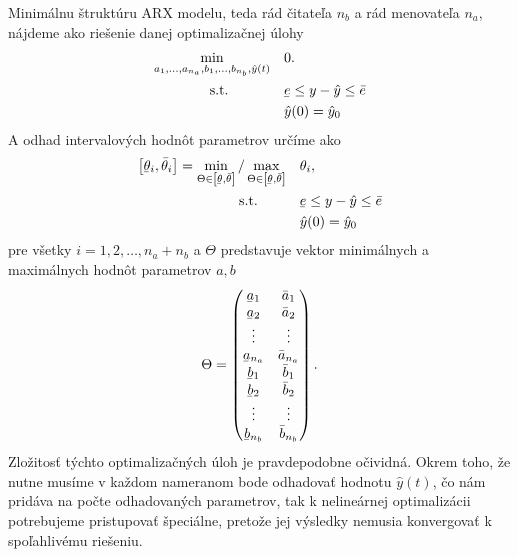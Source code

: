 Minimálnu štruktúru ARX modelu, teda rád čitateľa $ n_b $ a rád menovateľa $ n_a $, nájdeme ako riešenie danej optimalizačnej úlohy
\begin{equation}
	\begin{split}
		\min_{a_{1},\dots,a_{n_a},b_{1},\dots,b_{n_b},\hat{y}(t)} & \quad 0.\\
		\text{s.t.} \qquad \quad  & \quad \ubar{e} \leq y - \hat{y} \leq \bar{e} \\
		& \quad \hat{y}(0) = \hat{y}_{0}
	\end{split}
	\label{eq:gpe_arx_min_rad}
\end{equation}
A odhad intervalových hodnôt parametrov určíme ako
\begin{equation}
	\begin{split}
		\left[ \ubar{\theta}_i, \bar{\theta}_i \right] = \min_{\Theta \in \left[ \ubar{\theta}, \bar{\theta} \right]} / \max_{\Theta \in \left[ \ubar{\theta}, \bar{\theta} \right]} & \quad \theta_i,\\
		\text{s.t.} \qquad & \quad \ubar{e} \leq y - \hat{y} \leq \bar{e}\\
		& \quad \hat{y}(0) = \hat{y}_{0}
	\end{split}
	\label{eq:gpe_arx_param_est}
\end{equation}
pre všetky $ i = 1,2, \dots, n_a+n_b $ a $ \Theta $ predstavuje vektor minimálnych a maximálnych hodnôt parametrov $ a, b $
\begin{equation*}
	\Theta = 
	\begin{pmatrix}
		\ubar{a}_{1} & \bar{a}_{1}\\
		\ubar{a}_{2} & \bar{a}_{2}\\
		\vdots & \vdots\\
		\ubar{a}_{n_a} & \bar{a}_{n_a}\\
		\ubar{b}_{1} & \bar{b}_{1}\\
		\ubar{b}_{2} & \bar{b}_{2}\\
		\vdots & \vdots\\
		\ubar{b}_{n_b} & \bar{b}_{n_b}\\	
	\end{pmatrix}.
\end{equation*}
Zložitosť týchto optimalizačných úloh je pravdepodobne očividná. Okrem toho, že nutne musíme v každom nameranom bode odhadovať hodnotu $ \hat{y}(t) $, čo nám pridáva na počte odhadovaných parametrov, tak k nelineárnej optimalizácii potrebujeme pristupovať špeciálne, pretože jej výsledky nemusia konvergovať k spoľahlivému riešeniu.

